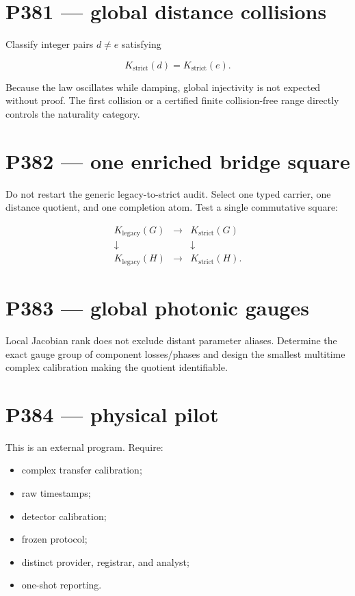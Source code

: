 \documentclass[11pt,a4paper,openany]{report}
\begin{document}
\section{P381 --- global distance collisions}

Classify integer pairs \(d\ne e\) satisfying

\[
K_{\mathrm{strict}}(d)=K_{\mathrm{strict}}(e).
\]

Because the law oscillates while damping, global injectivity is not expected without proof. The first collision or a certified finite collision-free range directly controls the naturality category.

\section{P382 --- one enriched bridge square}

Do not restart the generic legacy-to-strict audit. Select one typed carrier, one distance quotient, and one completion atom. Test a single commutative square:

\[
\begin{array}{ccc}
K_{\mathrm{legacy}}(G)&\longrightarrow&K_{\mathrm{strict}}(G)\\
\downarrow&&\downarrow\\
K_{\mathrm{legacy}}(H)&\longrightarrow&K_{\mathrm{strict}}(H).
\end{array}
\]

\section{P383 --- global photonic gauges}

Local Jacobian rank does not exclude distant parameter aliases. Determine the exact gauge group of component losses/\allowbreak{}phases and design the smallest multitime complex calibration making the quotient identifiable.

\section{P384 --- physical pilot}

This is an external program. Require:

\begin{itemize}
\item 
complex transfer calibration;

\item 
raw timestamps;

\item 
detector calibration;

\item 
frozen protocol;

\item 
distinct provider, registrar, and analyst;

\item 
one-shot reporting.

\end{itemize}
\end{document}
